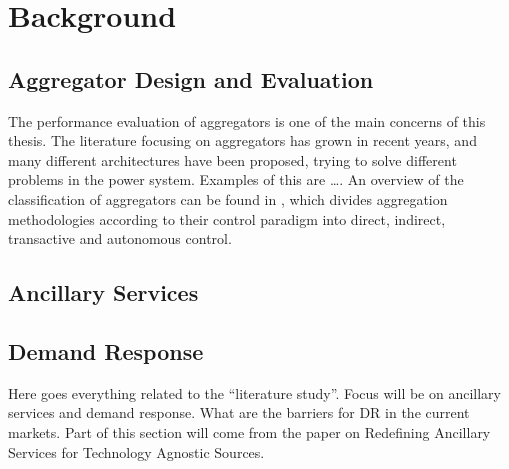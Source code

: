 \chapter{Background} %
\label{cha:background}
	\section{Aggregator Design and Evaluation}\label{sec:aggeval}
	The performance evaluation of aggregators is one of the main concerns of this thesis. 
	The literature focusing on aggregators has grown in recent years, and many different architectures have been proposed, trying to solve different problems in the power system. Examples of this are \ldots{}. An overview of the classification of aggregators can be found in , which divides aggregation methodologies according to their control paradigm into direct, indirect, transactive and autonomous control.
	\section{Ancillary Services}\label{sec:ancser}
	\section{Demand Response}\label{sec:demres}
Here goes everything related to the ``literature study''. Focus will be on ancillary services and demand response. What are the barriers for DR in the current markets. Part of this section will come from the paper on Redefining Ancillary Services for Technology Agnostic Sources.

